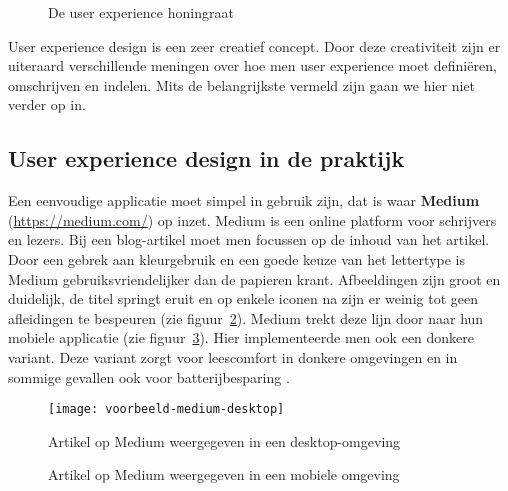 \begin{figure}
    \centering
    \def\svgwidth{.8\columnwidth}
    
    \caption{De user experience honingraat}
    \label{fig:ux-facets}
\end{figure}

User experience design is een zeer creatief concept. Door deze creativiteit zijn er uiteraard verschillende meningen over hoe men user experience moet definiëren, omschrijven en indelen. Mits de belangrijkste vermeld zijn gaan we hier niet verder op in.

\subsection{User experience design in de praktijk}
\label{sec:user-experience-in-software:user-experience-design-in-de-praktijk}

Een eenvoudige applicatie moet simpel in gebruik zijn, dat is waar \textbf{Medium} (\href{https://medium.com/@jtnakagawa/nothing-left-to-take-away-437eb23c2ae8}{https://medium.com/}) op inzet. Medium is een online platform voor schrijvers en lezers. Bij een blog-artikel moet men focussen op de inhoud van het artikel. Door een gebrek aan kleurgebruik en een goede keuze van het lettertype is Medium gebruiksvriendelijker dan de papieren krant. Afbeeldingen zijn groot en duidelijk, de titel springt eruit en op enkele iconen na zijn er weinig tot geen afleidingen te bespeuren (zie figuur~\ref{fig:ux-voorbeeld-medium:desktop}). Medium trekt deze lijn door naar hun mobiele applicatie (zie figuur~\ref{fig:ux-voorbeeld-medium:mobiel}). Hier implementeerde men ook een donkere variant. Deze variant zorgt voor leescomfort in donkere omgevingen en in sommige gevallen ook voor batterijbesparing \autocite{Jin2017}.

\begin{figure}
    \centering
    \texttt{[image: voorbeeld-medium-desktop]}
    \caption{Artikel op Medium weergegeven in een desktop-omgeving}
    \label{fig:ux-voorbeeld-medium:desktop}
\end{figure}

\begin{figure}
    \centering
    \qquad
    \caption{Artikel op Medium weergegeven in een mobiele omgeving}
    \label{fig:ux-voorbeeld-medium:mobiel}
\end{figure}

